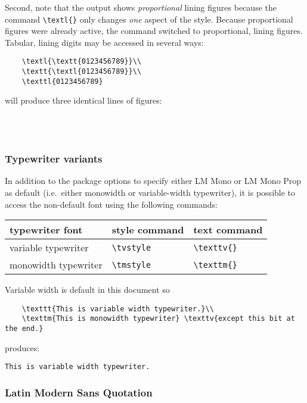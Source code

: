 \documentclass[11pt,british,a4paper]{article}
\begin{document}
Second, note that the output shows \emph{proportional} lining figures because the command \verb|\textl{}| only changes \emph{one} aspect of the style. Because proportional figures were already active, the command switched to proportional, lining figures. Tabular, lining digits may be accessed in several ways:
\begin{verbatim}
	\textl{\textt{0123456789}}\\
	\textt{\textl{0123456789}}\\
	\texttl{0123456789}
\end{verbatim}
will produce three identical lines of figures:
\begin{center}
	\\
	\\
\end{center}

\subsubsection{Typewriter variants}

In addition to the package options to specify either LM Mono or LM Mono Prop as default (i.e.\ either monowidth or variable-width typewriter), it is possible to access the non-default font using the following commands:
	\begin{longtable}{lll}
		\toprule
		\textbf{typewriter font}	&	\textbf{style command}	&	\textbf{text command}\\\midrule\endhead
		\bottomrule\endfoot
		variable typewriter				&	\verb|\tvstyle|					&	\verb|\texttv{}|\\
		monowidth typewriter		&	\verb|\tmstyle|					&	\verb|\texttm{}|
	\end{longtable}

Variable width is default in this document so
\begin{verbatim}
	\texttt{This is variable width typewriter.}\\
	\texttm{This is monowidth typewriter} \texttv{except this bit at the end.}
\end{verbatim}
produces:
\begin{center}
	\texttt{This is variable width typewriter.}\\
	 
\end{center}

\subsubsection{Latin Modern Sans Quotation}
\end{document}
